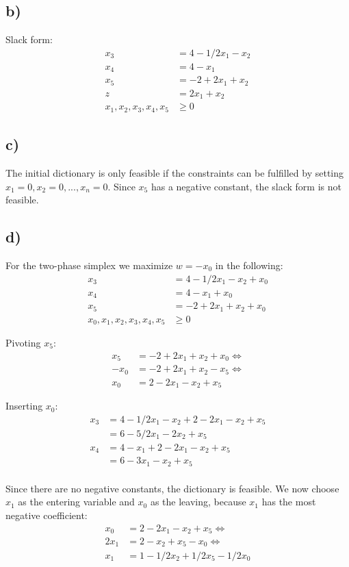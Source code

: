 \documentclass[12pt,a4paper]{article}
\begin{document}
\subsection*{b)}
Slack form:
\begin{align*}
x_3 & = 4 - 1/2x_1 - x_2 \\
x_4 & = 4 - x_1 \\
x_5 & = -2 + 2x_1 + x_2 \\
z & = 2x_1 + x_2 \\
x_1, x_2, x_3, x_4, x_5 & \ge 0
\end{align*}

\subsection*{c)}
The initial dictionary is only feasible if the constraints can be
fulfilled by setting $x_1 = 0, x_2 = 0, ..., x_n = 0$. Since $x_5$ has
a negative constant, the slack form is not feasible.

\subsection*{d)}
For the two-phase simplex we maximize
$w = -x_0$
in the following:
\begin{align*}
x_3 & = 4 - 1/2x_1 - x_2 + x_0\\
x_4 & = 4 - x_1 + x_0 \\
x_5 & = -2 + 2x_1 + x_2  + x_0\\
x_0, x_1, x_2, x_3, x_4, x_5 & \ge 0
\end{align*}

Pivoting $x_5$:
\begin{align*}
x_5 & = -2 + 2x_1 + x_2  + x_0 \Leftrightarrow \\
-x_0 & = -2 + 2x_1 + x_2 - x_5 \Leftrightarrow \\
x_0 & = 2 - 2x_1 -x_2 + x_5
\end{align*}

Inserting $x_0$:
\begin{align*}
x_3 & = 4 - 1/2x_1 - x_2 + 2 - 2x_1 -x_2 + x_5 \\
    & = 6 - 5/2x_1 - 2x_2 + x_5 \\
x_4 & = 4 - x_1 + 2 - 2x_1 -x_2 + x_5 \\
    & = 6 - 3x_1 - x_2 + x_5 \\
\end{align*}

Since there are no negative constants, the dictionary is feasible.
We now choose $x_1$ as the entering variable and $x_0$ as the leaving,
because $x_1$ has the most negative coefficient:
\begin{align*}
x_0 &= 2 - 2x_1 - x_2 + x_5 \Leftrightarrow \\
2x_1 &= 2 - x_2 + x_5 - x_0 \Leftrightarrow \\
x_1  &= 1 - 1/2x_2 + 1/2x_5 - 1/2x_0
\end{align*}
\end{document}
